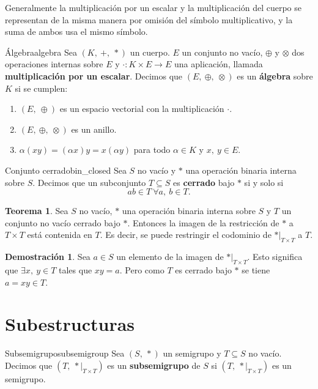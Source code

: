 \documentclass[a4paper]{book}
\theoremstyle{definition}
\newtheorem{theorem}{Teorema}[section]
\theoremstyle{ejemplo}
\theoremstyle{demostracion}
\newtheorem{dem}{Demostración}
\begin{document}
Generalmente la multiplicación por un escalar y la multiplicación del cuerpo se representan de la misma manera por omisión del símbolo multiplicativo, y la suma de ambos usa el mismo símbolo.

\begin{define}{Álgebra}{algebra}
	Sea $(K,\ +,\ *)$ un cuerpo. $E$ un conjunto no vacío, $\oplus$ y $\otimes$ dos operaciones internas sobre $E$ y $\cdot : K \times E \rightarrow E$ una aplicación, llamada \textbf{multiplicación por un escalar}. Decimos que $(E,\ \oplus,\ \otimes)$ es un \textbf{álgebra} sobre $K$ si se cumplen:
	\begin{enumerate}
		\item
		$(E,\ \oplus)$ es un espacio vectorial con la multiplicación $\cdot$.
		
		\item
		$(E,\ \oplus,\ \otimes)$ es un anillo.
		
		\item
		$\alpha (x y) = (\alpha x) y = x (\alpha y)$ para todo $\alpha \in K$ y $x,\ y \in E$. 
	\end{enumerate}
\end{define}

\begin{define}{Conjunto cerrado}{bin_closed}
	Sea $S$ no vacío y $*$ una operación binaria interna sobre $S$. Decimos que un subconjunto $T \subseteq S$ es \textbf{cerrado} bajo $*$ si y solo si
	\begin{equation*}
		ab \in T\ \forall a,\ b \in T.
	\end{equation*}
\end{define}

\begin{theorem}\label{thm:bin_restr}
	Sea $S$ no vacío, $*$ una operación binaria interna sobre $S$ y $T$ un conjunto no vacío cerrado bajo $*$. Entonces la imagen de la restricción de $*$ a $T \times T$ está contenida en $T$. Es decir, se puede restringir el codominio de $*|_{T \times T}$ a $T$.
\end{theorem}

\begin{dem}
	Sea $a \in S$ un elemento de la imagen de $*|_{T \times T}$. Esto significa que $\exists x,\ y \in T$ tales que $xy = a$. Pero como $T$ es cerrado bajo $*$ se tiene $a = xy \in T$.
\end{dem}






\section{Subestructuras}
\begin{define}{Subsemigrupo}{subsemigroup}
	Sea $(S,\ *)$ un semigrupo y $T \subseteq S$ no vacío. Decimos que $(T,\ *|_{T \times T})$ es un \textbf{subsemigrupo} de $S$ si $(T,\ *|_{T \times T})$ es un semigrupo.
\end{define}
\end{document}

